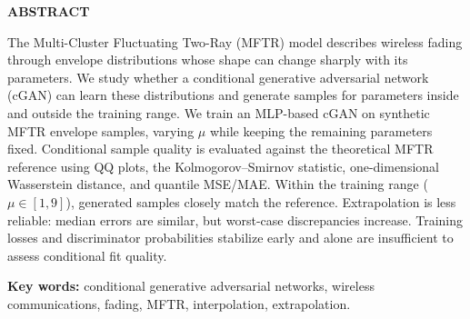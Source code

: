 \begin{center}
    \textbf{\fontsize{14}{16}\selectfont ABSTRACT}
\end{center}
\fontsize{12}{14}\selectfont
The Multi-Cluster Fluctuating Two-Ray (MFTR) model describes wireless fading through envelope distributions whose shape can change sharply with its parameters. We study whether a conditional generative adversarial network (cGAN) can learn these distributions and generate samples for parameters inside and outside the training range. We train an MLP-based cGAN on synthetic MFTR envelope samples, varying $\mu$ while keeping the remaining parameters fixed. Conditional sample quality is evaluated against the theoretical MFTR reference using QQ plots, the Kolmogorov--Smirnov statistic, one-dimensional Wasserstein distance, and quantile MSE/MAE. Within the training range ($\mu\in[1,9]$), generated samples closely match the reference. Extrapolation is less reliable: median errors are similar, but worst-case discrepancies increase. Training losses and discriminator probabilities stabilize early and alone are insufficient to assess conditional fit quality.

\vspace{10pt}
\begin{center}
    \textbf{Key words:} conditional generative adversarial networks, wireless communications, fading, MFTR, interpolation, extrapolation.
\end{center}
